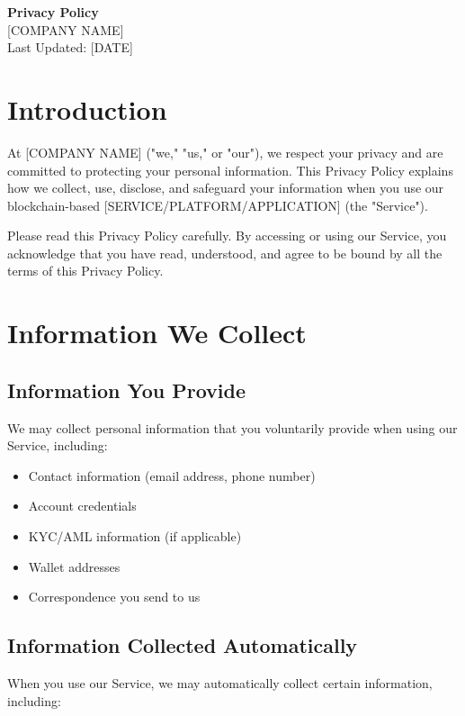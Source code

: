 \documentclass[12pt]{article}
\begin{document}
\begin{center}
    {\LARGE \textbf{Privacy Policy}}\\[0.5cm]
    {\large [COMPANY NAME]}\\[0.2cm]
    {\large Last Updated: [DATE]}
\end{center}

\section{Introduction}

At [COMPANY NAME] ("we," "us," or "our"), we respect your privacy and are committed to protecting your personal information. This Privacy Policy explains how we collect, use, disclose, and safeguard your information when you use our blockchain-based [SERVICE/PLATFORM/APPLICATION] (the "Service").

Please read this Privacy Policy carefully. By accessing or using our Service, you acknowledge that you have read, understood, and agree to be bound by all the terms of this Privacy Policy.

\section{Information We Collect}

\subsection{Information You Provide}

We may collect personal information that you voluntarily provide when using our Service, including:

\begin{itemize}
    \item Contact information (email address, phone number)
    \item Account credentials
    \item KYC/AML information (if applicable)
    \item Wallet addresses
    \item Correspondence you send to us
\end{itemize}

\subsection{Information Collected Automatically}

When you use our Service, we may automatically collect certain information, including:
\end{document}

